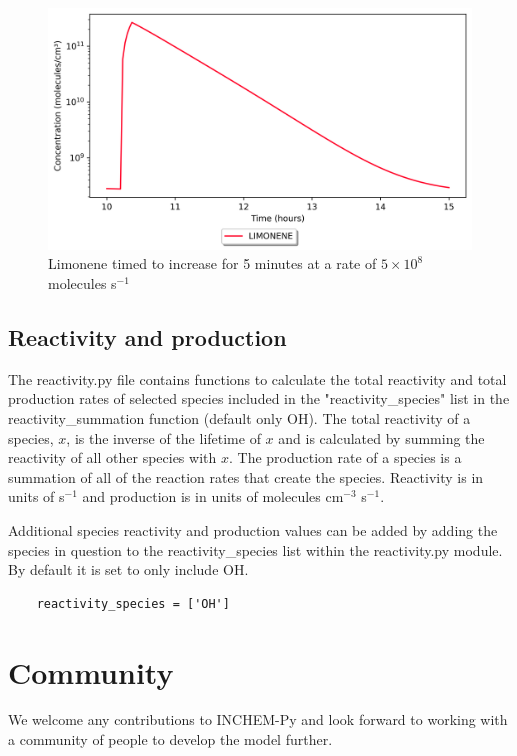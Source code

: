 \documentclass[a4paper]{refart}
\begin{document}
\clearpage
\begin{figure}[h!]
    \centering
    \includegraphics[width=\textwidth]{timed_limonene.png}
    \caption{Limonene timed to increase for 5 minutes at a rate of $5\times10^8$ molecules s$^{-1}$}
    \label{fig:timed_limonene}
\end{figure}

\subsection{Reactivity and production}\label{reactivity.py}
The reactivity.py file contains functions to calculate the total reactivity and total production rates of selected species included in the "reactivity\_species" list in the reactivity\_summation function (default only OH). The total reactivity of a species, $x$, is the inverse of the lifetime of $x$ and is calculated by summing the reactivity of all other species with $x$. The production rate of a species is a summation of all of the reaction rates that create the species. Reactivity is in units of s$^{-1}$ and production is in units of molecules cm$^{-3}$ s$^{-1}$.

Additional species reactivity and production values can be added by adding the species in question to the reactivity\_species list within the reactivity.py module. By default it is set to only include OH.
\begin{verbatim}
    reactivity_species = ['OH']
\end{verbatim}

\section{Community}
We welcome any contributions to INCHEM-Py and look forward to working with a community of people to develop the model further.
\end{document}
